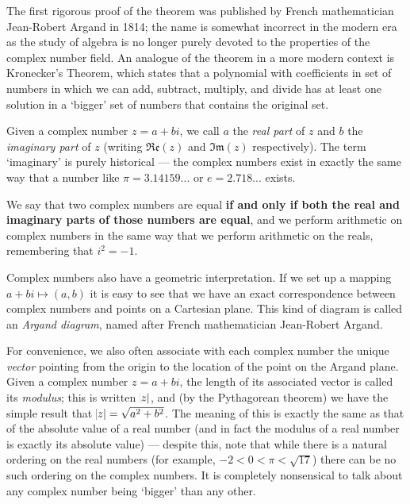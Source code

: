 \documentclass[a4paper,10pt,titlepage]{article}
\theoremstyle{definition}
\newcommand*\realp[1]{ \mathfrak{Re} \left ( {#1} \right )  }
\newcommand*\imagp[1]{ \mathfrak{Im} \left ( {#1} \right )  }
\begin{document}
The first rigorous proof of the theorem was published by French mathematician Jean-Robert Argand in 1814; the name is somewhat
incorrect in the modern era as the study of algebra is no longer purely devoted to the properties of the complex number field.
An analogue of the theorem in a more modern context is Kronecker's Theorem, which states that a polynomial with coefficients
in set of numbers in which we can add, subtract, multiply, and divide has at least one solution in a `bigger' set of numbers that
contains the original set.

Given a complex number $ z = a + bi $, we call $ a $ the \emph{real part} of $ z $ and $ b $ the \emph{imaginary part}
of $ z $ (writing $ \realp{z} $ and $ \imagp{z} $ respectively). The term `imaginary' is purely historical --- the complex numbers
exist in exactly the same way that a number like $ \pi = 3.14159... $ or $ e = 2.718... $ exists.

We say that two complex numbers are equal \textbf{if and only if both the real and imaginary parts of those numbers are equal}, and
we perform arithmetic on complex numbers in the same way that we perform arithmetic on the reals, remembering that $ i^2 = -1 $.

Complex numbers also have a geometric interpretation. If we set up a mapping $ a + bi \mapsto (a, b) $ it is easy to see that we
have an exact correspondence between complex numbers and points on a Cartesian plane. This kind of diagram is called an \emph{Argand
diagram}, named after French mathematician Jean-Robert Argand.

For convenience, we also often associate with each complex number the unique \emph{vector} pointing from the origin to the location
of the point on the Argand plane. Given a complex number $ z = a + bi $, the length of its associated vector is called its \emph{modulus};
this is written $ \abs{z} $, and (by the Pythagorean theorem) we have the simple result that $ \abs{z} = \sqrt{a^2 + b^2} $. The meaning
of this is exactly the same as that of the absolute value of a real number (and in fact the modulus of a real number is exactly its absolute
value) --- despite this, note that while there is a natural ordering on the real numbers (for example, $ -2 < 0 < \pi < \sqrt{17} $) there
can be no such ordering on the complex numbers. It is completely nonsensical to talk about any complex number being `bigger' than any other.
\end{document}
